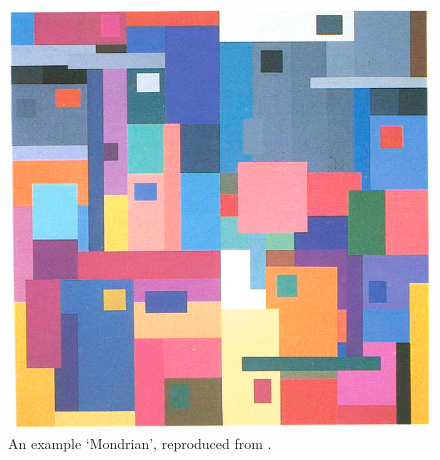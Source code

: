 \begin{figure}[hbp]
\includegraphics[width=\textwidth]{figs/tablet/mondrian.png}
\caption{An example `Mondrian', reproduced from \citet{land_recent_1986}.}
\label{fig:mondrian}
\end{figure}